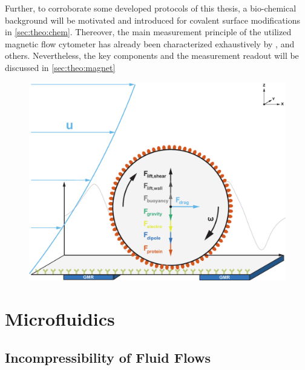 Further, to corroborate some developed protocols of this thesis, a bio-chemical background will be motivated and introduced for covalent surface modifications in \cref{sec:theo:chem}. Thereover, the main measurement principle of the utilized magnetic flow cytometer has already been characterized exhaustively by \citet{lit:thes:helou}, \citet{lit:thes:reisbeck} and others.\cite{lit:thes:esthi,lit:thes:brenner} Nevertheless, the key components and the measurement readout will be discussed in \cref{sec:theo:magnet}
\begin{figure}[!htb]
	\centering
	\includegraphics[width=\linewidth]{Ressources/Fluidic/FigureOne}
	\label{fig:theo:figOne}
\end{figure}

\section{Microfluidics}

\subsection{Incompressibility of Fluid Flows}

